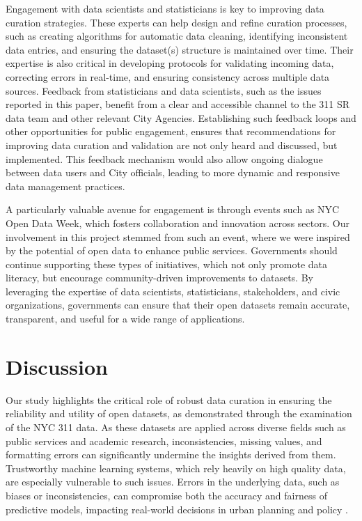 \documentclass[linenumber]{jdsart}
\begin{document}
Engagement with data scientists and statisticians is key to improving 
data curation strategies. These experts can help design and refine 
curation processes, such as creating algorithms for automatic data 
cleaning, identifying inconsistent data entries, and ensuring the 
dataset(s) structure is maintained over time. Their expertise is also 
critical in developing protocols for validating incoming data, correcting 
errors in real-time, and ensuring consistency across multiple data sources. 
Feedback from statisticians and data scientists, such as the issues reported 
in this paper, benefit from a clear and accessible channel to the 311 SR data 
team and other relevant City Agencies. Establishing such feedback loops 
and other opportunities for public engagement, ensures that 
recommendations for improving data curation and validation 
are not only heard and discussed, but implemented. This feedback 
mechanism would also allow ongoing dialogue between 
data users and City officials, leading to more dynamic 
and responsive data management practices.


A particularly valuable avenue for engagement is through events such as NYC 
Open Data Week, which fosters collaboration and innovation across sectors. 
Our involvement in this project stemmed from such an event, where we were 
inspired by the potential of open data to enhance public services. Governments 
should continue supporting these types of initiatives, which not only promote 
data literacy, but encourage community-driven improvements to datasets. 
By leveraging the expertise of data scientists, statisticians, stakeholders, 
and civic organizations, governments can ensure that their open datasets 
remain accurate, transparent, and useful for a wide range of applications.


\section{Discussion} 
\label{sec:discussion}
Our study highlights the critical role of robust data curation in
ensuring the reliability and utility of open datasets, as demonstrated
through the examination of the NYC 311 data. As these datasets are
applied across diverse fields such as public services and academic
research, inconsistencies, missing values, and formatting errors can
significantly undermine the insights derived from them. Trustworthy
machine learning systems, which rely heavily on high quality data, are
especially vulnerable to such issues. Errors in the underlying data,
such as biases or inconsistencies, can compromise both the accuracy
and fairness of predictive models, impacting real-world decisions in
urban planning and policy \citep{rahm2000data, geiger2020garbage}.
\end{document}
